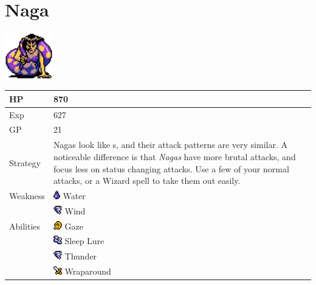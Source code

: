 \section{Naga}
\label{monster:naga}

\includegraphics[height=2cm,keepaspectratio]{./resources/monster/naga}

\begin{longtable}{ l p{9cm} }
	HP
	& 870
\\ \hline
	Exp
	& 627
\\ \hline
	GP
	& 21
\\ \hline
	Strategy
	& Nagas look like \nameref{monster:lamia}s, and their attack patterns are very similar. A noticeable difference is that \textit{Nagas} have more brutal attacks, and focus less on status changing attacks. Use a few of your normal attacks, or a Wizard spell to take them out easily.
\\ \hline
	Weakness
	& \includegraphics[height=1em,keepaspectratio]{./resources/effects/water} Water \\
	& \includegraphics[height=1em,keepaspectratio]{./resources/effects/wind} Wind
\\ \hline
	Abilities
	& \includegraphics[height=1em,keepaspectratio]{./resources/effects/confusion} Gaze \\
	& \includegraphics[height=1em,keepaspectratio]{./resources/effects/sleep} Sleep Lure \\
	& \includegraphics[height=1em,keepaspectratio]{./resources/effects/wind} Thunder \\
	& \includegraphics[height=1em,keepaspectratio]{./resources/effects/damage} Wraparound
\end{longtable}

